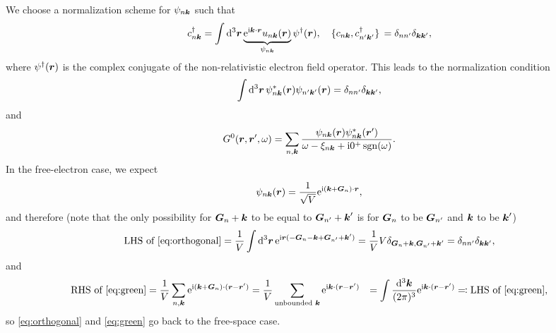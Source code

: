 \documentclass[hyperref, a4paper]{report}
\DeclareMathOperator{\sgn}{sgn}
\newcommand*{\ii}{\mathrm{i}}
\newcommand*{\ee}{\mathrm{e}}
\def\\{}%
\begin{document}
We choose a normalization scheme for $\psi_{n \vb*{k}}$ such that 
\begin{equation}
    c^\dagger_{n \vb*{k}} = \int \dd[3]{\vb*{r}} 
    \underbrace{\ee^{\ii \vb*{k} \cdot \vb*{r}} u_{n \vb*{k}}(\vb*{r})}_{\psi_{n \vb*{k}}} 
    \psi^\dagger(\vb*{r}),
    \quad \acomm*{c_{n \vb*{k}}}{c^\dagger_{n' \vb*{k}'}} = \delta_{n n'} \delta_{\vb*{k} \vb*{k}'},
\end{equation}
where $\psi^\dagger(\vb*{r})$ is the complex conjugate 
of the non-relativistic electron field operator.
This leads to the normalization condition 
\begin{equation}
    \int \dd[3]{\vb*{r}} \psi^*_{n \vb*{k}}(\vb*{r}) \psi_{n' \vb*{k}'}(\vb*{r}) 
    = \delta_{n n'} \delta_{\vb*{k} \vb*{k}'},
    \label{eq:orthogonal}
\end{equation}
and
\begin{equation}
    G^0(\vb*{r}, \vb*{r}', \omega) = \sum_{n, \vb*{k}} \frac{
        \psi_{n \vb*{k}}(\vb*{r}) \psi^*_{n \vb*{k}}(\vb*{r}')
    }{\omega - \xi_{n \vb*{k}} + \ii 0^+ \sgn(\omega)}.
    \label{eq:green}
\end{equation}
In the free-electron case, 
we expect 
\begin{equation}
    \psi_{n \vb*{k}}(\vb*{r}) = \frac{1}{\sqrt{V}} \ee^{\ii (\vb*{k} + \vb*{G}_n) \cdot \vb*{r}},
\end{equation}
and therefore (note that the only possibility for $\vb*{G}_n + \vb*{k}$
to be equal to $\vb*{G}_{n'} + \vb*{k}'$
is for $\vb*{G}_n$ to be $\vb*{G}_{n'}$
and $\vb*{k}$ to be $\vb*{k}'$)
\[
    \text{LHS of \eqref{eq:orthogonal}} = 
    \frac{1}{V} \int \dd[3]{\vb*{r}} \ee^{\ii \vb*{r} (
        - \vb*{G}_n - \vb*{k} + \vb*{G}_{n'} + \vb*{k}'
    )} = 
    \frac{1}{V} V \delta_{\vb*{G}_n + \vb*{k}, \vb*{G}_{n'} + \vb*{k}'} 
    = \delta_{n n'} \delta_{\vb*{k} \vb*{k}'},
\]
and 
\[
    \begin{aligned}
        \text{RHS of \eqref{eq:green}} &= 
        \frac{1}{V} \sum_{n, \vb*{k}} 
        \ee^{\ii (\vb*{k} + \vb*{G}_n) \cdot (\vb*{r} - \vb*{r}')} 
        = \frac{1}{V} \sum_{\text{unbounded $\vb*{k}$}} 
        \ee^{\ii \vb*{k} \cdot (\vb*{r} - \vb*{r}')} \\
        &= \int \frac{\dd[3]{\vb*{k}}}{(2\pi)^3}
        \ee^{\ii \vb*{k} \cdot (\vb*{r} - \vb*{r}')}
        \eqqcolon \text{LHS of \eqref{eq:green}}, 
    \end{aligned}
\]
so \eqref{eq:orthogonal} and \eqref{eq:green}
go back to the free-space case.
\end{document}
